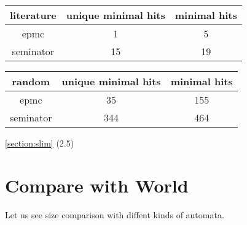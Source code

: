 \documentclass[
	digital
nolof, nolot
]{fithesis3}
\begin{document}
{\begin{center}
	\begin{tabular}{ |c|c|c| } 
		\hline
		literature&unique minimal hits&minimal hits\\
		\hline
		epmc&1 & 5\\
		\hline
		seminator &15 & 19\\ 
		\hline
	\end{tabular}
\end{center}
		\begin{center}
			\begin{tabular}{ |c|c|c| } 
				\hline
				random&unique minimal hits&minimal hits\\
				\hline
				epmc&35 & 155\\
				\hline
				seminator &344 & 464\\ 
				\hline
			\end{tabular}
		\end{center}
		
		
		\ref{section:slim}
		(2.5)
	
		\section{Compare with World}
		Let us see size comparison with diffent kinds of automata.
		
}
\end{document}
